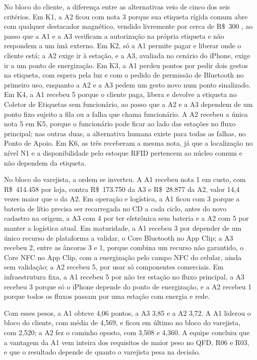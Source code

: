 No bloco do cliente, a diferença entre as alternativas veio de cinco dos seis critérios. Em K1, a A2 ficou com nota 3 porque sua etiqueta rígida comum abre com qualquer destacador magnético, vendido livremente por cerca de R\$~300 \cite{canalautomacao2026desacoplador}, ao passo que a A1 e a A3 verificam a autorização na própria etiqueta e não respondem a um ímã externo. Em K2, só a A1 permite pagar e liberar onde o cliente está; a A2 exige ir à estação, e a A3, avaliada no cenário do iPhone, exige ir a um ponto de energização. Em K3, a A1 perdeu pontos por pedir dois gestos na etiqueta, com espera pela luz e com o pedido de permissão de Bluetooth no primeiro uso, enquanto a A2 e a A3 pedem um gesto novo num ponto sinalizado. Em K4, a A1 recebeu 5 porque o cliente paga, libera e devolve a etiqueta no Coletor de Etiquetas sem funcionário, ao passo que a A2 e a A3 dependem de um ponto fixo sujeito a fila ou a falha que chama funcionário. A A2 recebeu a única nota 5 em K5, porque o funcionário pode ficar ao lado das estações no fluxo principal; nas outras duas, a alternativa humana existe para todas as falhas, no Ponto de Apoio. Em K6, as três receberam a mesma nota, já que a localização no nível N1 e a disponibilidade pelo estoque RFID pertencem ao núcleo comum e não dependem da etiqueta.

No bloco do varejista, a ordem se inverteu. A A1 recebeu nota 1 em custo, com R\$~414.458 por loja, contra R\$~173.750 da A3 e R\$~28.877 da A2, valor 14,4 vezes maior que o da A2. Em operação e logística, a A1 ficou com 3 porque a bateria de lítio precisa ser recarregada no CD a cada ciclo, antes do novo cadastro na origem, a A3 com 4 por ter eletrônica sem bateria e a A2 com 5 por manter a logística atual. Em maturidade, a A1 recebeu 3 por depender de um único recurso de plataforma a validar, o Core Bluetooth no App Clip; a A3 recebeu 2, entre as âncoras 3 e 1, porque combina um recurso não garantido, o Core NFC no App Clip, com a energização pelo campo NFC do celular, ainda sem validação; a A2 recebeu 5, por usar só componentes comerciais. Em infraestrutura fixa, a A1 recebeu 5 por não ter estação no fluxo principal, a A3 recebeu 3 porque só o iPhone depende do ponto de energização, e a A2 recebeu 1 porque todos os fluxos passam por uma estação com energia e rede.

Com esses pesos, a A1 obteve 4,06 pontos, a A3 3,85 e a A2 3,72. A A1 liderou o bloco do cliente, com média de 4,569, e ficou em último no bloco do varejista, com 2,520; a A2 fez o caminho oposto, com 3,508 e 4,360. A equipe concluiu que a vantagem da A1 vem inteira dos requisitos de maior peso no QFD, R06 e R03, e que o resultado depende de quanto o varejista pesa na decisão.

